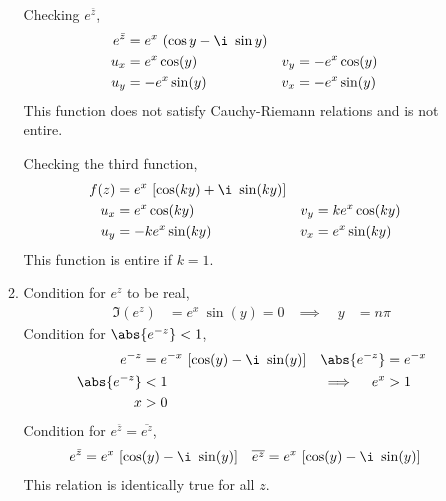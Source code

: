 \begin{enumerate}
\begin{enumerate}
                    Checking $ e^{\bar{z}} $,
                    \begin{align}
                        e^{\bar{z}} & = e^x\ (\cos y - \i\ \sin y)   \\
                        u_x         & = e^x \cos(y)                &
                        v_y         & = -e^x \cos(y)                 \\
                        u_y         & = -e^x \sin(y)               &
                        v_x         & = -e^x \sin(y)                 \\
                    \end{align}
                    This function does not satisfy Cauchy-Riemann relations and is
                    \textcolor{y_p}{not entire}. \par

                    Checking the third function,
                    \begin{align}
                        f(z) & = e^x\ [\cos(ky) + \i\ \sin(ky)]   \\
                        u_x  & = e^x \cos(ky)                   &
                        v_y  & = ke^x \cos(ky)                    \\
                        u_y  & = -ke^x \sin(ky)                 &
                        v_x  & = e^x \sin(ky)
                    \end{align}
                    This function is \textcolor{y_h}{entire if $ k  = 1$}.

              \item Condition for $ e^z $ to be real,
                    \begin{align}
                        \Im{(e^z)}       & = e^x\ \sin(y) = 0 &
                        \implies \quad y & = n\pi
                    \end{align}
                    Condition for $ \abs{e^{-z}} < 1 $,
                    \begin{align}
                        e^{-z}               & = e^{-x}\ [\cos(y) - \i\ \sin(y)] &
                        \abs{e^{-z}}         & = e^{-x}                            \\
                        \abs{e^{-z}}         & < 1                               &
                        \implies \quad e^{x} & > 1                                 \\
                        x                    & > 0
                    \end{align}
                    Condition for $ e^{\bar{z}} = \overline{e^z} $,
                    \begin{align}
                        e^{\bar{z}}    & = e^{x}\ [\cos(y) - \i\ \sin(y)] &
                        \overline{e^z} & = e^{x}\ [\cos(y) - \i\ \sin(y)]
                    \end{align}
                    This relation is identically true for all $ z $.


\end{enumerate}
\end{enumerate}
